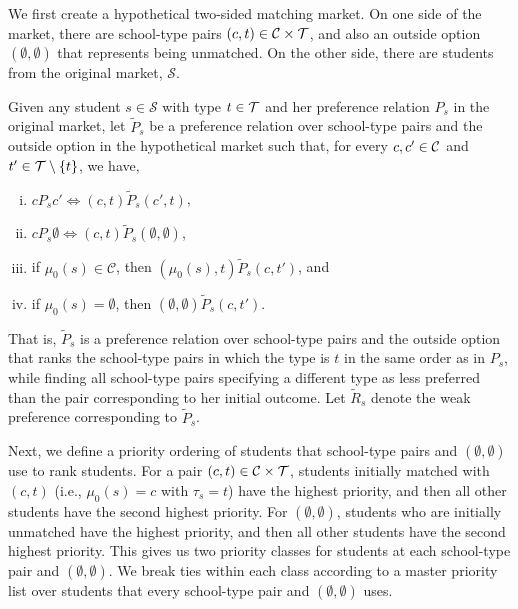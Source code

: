 \documentclass[12pt]{amsart}
\theoremstyle{remark}
\def\S{\mathcal{S}} \def\cals{\mathcal{S}}
\newcommand{\mby}[1]{{\color{blue} MBY: #1 }}
\begin{document}
We first create a hypothetical two-sided matching market. On one side of the market, there are school-type pairs $(c,t) \in \mathcal{C} \times \mathcal{T}$, and also an outside option $(\emptyset,\emptyset)$ that represents being unmatched. On the other side, there are students from the original market, $\S$.

Given any student $s \in \S$ with type $t\in \mathcal{T}$ and her preference relation $P_s$ in the original market, let $\tilde P_s$ be a preference relation over
school-type pairs and the outside option in the hypothetical market such that, for every $c,c' \in \mathcal{C}$ and $t'\in \mathcal{T} \setminus \{t\}$, we have,
\begin{enumerate}[(i)]
\item $c \mathrel{P_s} c' \iff (c,t) \mathrel{\tilde P_s} (c', t)$,
\item $c \mathrel{P_s} \emptyset \iff (c,t) \mathrel{\tilde P_s} (\emptyset,\emptyset)$,
\item if $\mu_0(s) \in \mathcal{C}$, then $(\mu_0(s),t) \mathrel{\tilde P_s} (c,t')$, and
\item if $\mu_0(s) = \emptyset$, then $(\emptyset,\emptyset) \mathrel{\tilde P_s} (c,t')$.
\end{enumerate}
That is, $\tilde P_s$ is a preference relation over school-type pairs and the outside option that ranks the school-type
pairs in which the type is $t$ in the same order as in $P_s$, while finding all school-type
pairs specifying a different type as less preferred than the pair corresponding to her initial outcome.
Let $\mathrel{\tilde R_s}$ denote the weak preference corresponding to $\mathrel{\tilde P_s}$.

Next, we define a priority ordering of students that school-type pairs and $(\emptyset,\emptyset)$ use to rank students. For a pair
$(c,t)\in \mathcal{C} \times \mathcal{T}$, students initially matched with $(c,t)$ (i.e., $\mu_0(s)=c$ with $\tau_s = t$) have the highest priority, and then all other students have
the second highest priority. For $(\emptyset,\emptyset)$, students who are initially unmatched have the highest priority, and then all
other students have the second highest priority. This gives us two priority classes for students at each school-type pair and $(\emptyset,\emptyset)$.
We break ties within each class according to a master priority list over students that every school-type pair and $(\emptyset,\emptyset)$ uses.
\end{document}
